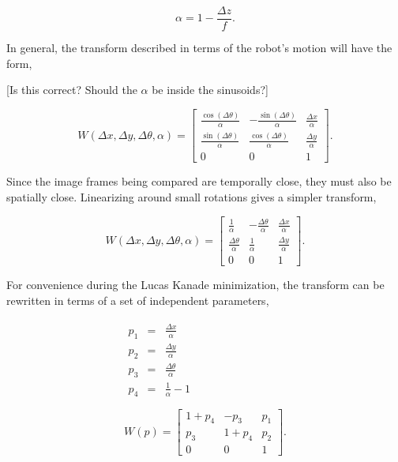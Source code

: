 \documentclass[letterpaper, 10 pt, conference]{ieeeconf}
\newcommand{\comment}[1]{{\color{red}[#1]}}
\begin{document}
\begin{equation} \label{eq:z_motion_conversion}
	\alpha = 1 - \frac{\Delta z}{f}.
\end{equation}

In general, the transform described in terms of the robot's motion will have the form,

\comment{Is this correct? Should the $\alpha$ be inside the sinusoids?}

\begin{equation*}
W(\Delta x, \Delta y, \Delta \theta, \alpha) = \begin{bmatrix} \frac{\cos(\Delta \theta)}{\alpha} & -\frac{\sin(\Delta \theta)}{\alpha} & \frac{\Delta x}{\alpha} \\ \frac{\sin(\Delta \theta)}{\alpha} & \frac{\cos(\Delta \theta)}{\alpha} & \frac{\Delta y}{\alpha} \\ 0 & 0 & 1 \end{bmatrix}.
\end{equation*}

Since the image frames being compared are temporally close, they must also be spatially close. Linearizing around small rotations gives a simpler transform,

\begin{equation*}
W(\Delta x, \Delta y, \Delta \theta, \alpha) = \begin{bmatrix} \frac{1}{\alpha} & -\frac{\Delta \theta}{\alpha} & \frac{\Delta x}{\alpha} \\ \frac{\Delta \theta}{\alpha} & \frac{1}{\alpha} & \frac{\Delta y}{\alpha} \\ 0 & 0 & 1 \end{bmatrix}.
\end{equation*}

For convenience during the Lucas Kanade minimization, the transform can be rewritten in terms of a set of independent parameters,

\begin{eqnarray}
\begin{split} \label{eq:warp_param_conversion}
p_1 &=& \frac{\Delta x}{\alpha}\\
p_2 &=& \frac{\Delta y}{\alpha}\\
p_3 &=& \frac{\Delta \theta}{\alpha}\\
p_4 &=& \frac{1}{\alpha} - 1\\
\end{split}
\\ \label{eq:param_warp}
W(p) = \begin{bmatrix} 1+p_4 & -p_3 & p_1 \\ p_3 & 1+p_4 & p_2 \\ 0 & 0 & 1 \end{bmatrix}.
\end{eqnarray}
\end{document}
